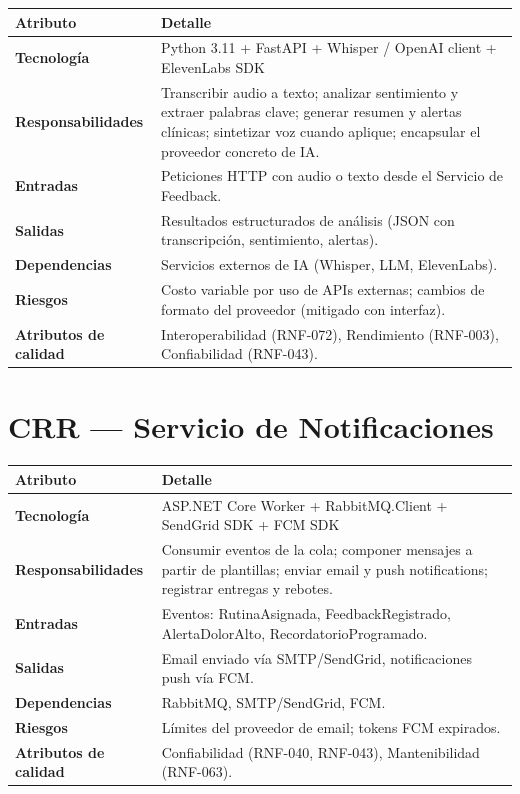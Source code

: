 \begin{tabularx}{\textwidth}{>{\bfseries}L{3.5cm} X}
  \toprule
  \textbf{\color{fmAccent}Atributo} & \textbf{\color{fmAccent}Detalle} \\
  \midrule
  Tecnología & Python 3.11 + FastAPI + Whisper / OpenAI client + ElevenLabs SDK \\
  Responsabilidades & Transcribir audio a texto; analizar sentimiento y extraer palabras clave; generar resumen y alertas clínicas; sintetizar voz cuando aplique; encapsular el proveedor concreto de IA. \\
  Entradas & Peticiones HTTP con audio o texto desde el Servicio de Feedback. \\
  Salidas & Resultados estructurados de análisis (JSON con transcripción, sentimiento, alertas). \\
  Dependencias & Servicios externos de IA (Whisper, LLM, ElevenLabs). \\
  Riesgos & Costo variable por uso de APIs externas; cambios de formato del proveedor (mitigado con interfaz). \\
  Atributos de calidad & Interoperabilidad (RNF-072), Rendimiento (RNF-003), Confiabilidad (RNF-043). \\
  \bottomrule
\end{tabularx}

\section{CRR --- Servicio de Notificaciones}

\begin{tabularx}{\textwidth}{>{\bfseries}L{3.5cm} X}
  \toprule
  \textbf{\color{fmAccent}Atributo} & \textbf{\color{fmAccent}Detalle} \\
  \midrule
  Tecnología & ASP.NET Core Worker + RabbitMQ.Client + SendGrid SDK + FCM SDK \\
  Responsabilidades & Consumir eventos de la cola; componer mensajes a partir de plantillas; enviar email y push notifications; registrar entregas y rebotes. \\
  Entradas & Eventos: RutinaAsignada, FeedbackRegistrado, AlertaDolorAlto, RecordatorioProgramado. \\
  Salidas & Email enviado vía SMTP/SendGrid, notificaciones push vía FCM. \\
  Dependencias & RabbitMQ, SMTP/SendGrid, FCM. \\
  Riesgos & Límites del proveedor de email; tokens FCM expirados. \\
  Atributos de calidad & Confiabilidad (RNF-040, RNF-043), Mantenibilidad (RNF-063). \\
  \bottomrule
\end{tabularx}